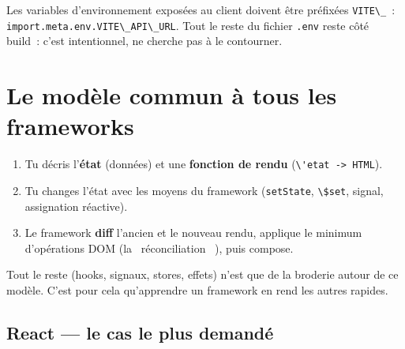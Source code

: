 \documentclass[12pt,a4paper,twoside,openright]{book}
\begin{document}
Les variables d'environnement expos\'ees au client doivent \^etre pr\'efix\'ees \verb|VITE\_|~:
\verb|import.meta.env.VITE\_API\_URL|. Tout le reste du fichier \verb|.env| reste c\^ot\'e build~:
c'est intentionnel, ne cherche pas \`a le contourner.

\section{Le mod\`ele commun \`a tous les frameworks}

\begin{enumerate}
  \item Tu d\'ecris l'\textbf{\'etat} (donn\'ees) et une \textbf{fonction de rendu}
        (\verb|\'etat -> HTML|).
  \item Tu changes l'\'etat avec les moyens du framework (\verb|setState|, \verb|\$set|, signal,
        assignation r\'eactive).
  \item Le framework \textbf{diff} l'ancien et le nouveau rendu, applique le minimum
        d'op\'erations DOM (la \og ~r\'econciliation~ \fg{}), puis compose.
\end{enumerate}

Tout le reste (hooks, signaux, stores, effets) n'est que de la broderie autour de ce mod\`ele.
C'est pour cela qu'apprendre un framework en rend les autres rapides.

\subsection{React --- le cas le plus demand\'e}
\end{document}
